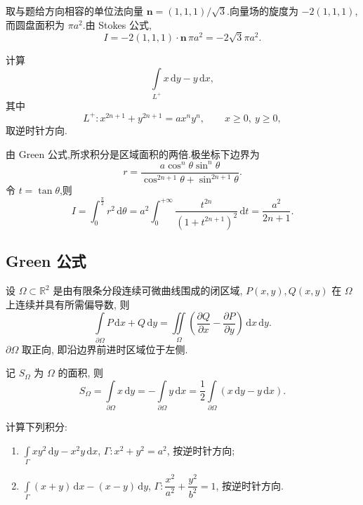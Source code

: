\begin{solution}
    取与题给方向相容的单位法向量 $\bm n=(1,1,1)/\sqrt{3}$.向量场的旋度为 $-2(1,1,1)$,而圆盘面积为 $\pi a^2$.由 Stokes 公式,
    \[
        I=-2(1,1,1)\cdot\bm n\,\pi a^2=-2\sqrt{3}\pi a^2.
    \]
\end{solution}

\begin{example}
    计算
    \[
        \displaystyle\int\limits_{L^+}x\,\mathrm{d}y-y\,\mathrm{d}x,
    \]
    其中
    \[
        L^+:x^{2n+1}+y^{2n+1}=ax^ny^n,\qquad x\geq0,\ y\geq0,
    \]
    取逆时针方向.
\end{example}
\exampleblank

\begin{solution}
    由 Green 公式,所求积分是区域面积的两倍.极坐标下边界为
    \[
        r=\dfrac{a\cos^n\theta\sin^n\theta}{\cos^{2n+1}\theta+\sin^{2n+1}\theta}.
    \]
    令 $t=\tan\theta$,则
    \[
        I=\int_0^{\frac{\pi}{2}}r^2\,\mathrm{d}\theta
        =a^2\int_0^{+\infty}\dfrac{t^{2n}}{(1+t^{2n+1})^2}\,\mathrm{d}t
        =\dfrac{a^2}{2n+1}.
    \]
\end{solution}



\subsection{Green 公式}

\begin{theorem}
    \leavevmode\par\noindent
    设 $\Omega\subset\mathbb{R}^2$ 是由有限条分段连续可微曲线围成的闭区域, $P(x,y),Q(x,y)$ 在 $\Omega$ 上连续并具有所需偏导数, 则
    \[
        \displaystyle\int\limits_{\partial\Omega}P\,\mathrm{d}x+Q\,\mathrm{d}y
        =\iint\limits_\Omega\left(\dfrac{\partial Q}{\partial x}-\dfrac{\partial P}{\partial y}\right)\,\mathrm{d}x\,\mathrm{d}y.
    \]
    $\partial\Omega$ 取正向, 即沿边界前进时区域位于左侧.
\end{theorem}

\begin{corollary}[\markstar]
    记 $S_\Omega$ 为 $\Omega$ 的面积, 则
    \[
        S_\Omega
        =\int\limits_{\partial\Omega}x\,\mathrm{d}y
        =-\int\limits_{\partial\Omega}y\,\mathrm{d}x
        =\dfrac{1}{2}\int\limits_{\partial\Omega}(x\,\mathrm{d}y-y\,\mathrm{d}x).
    \]
\end{corollary}

\begin{example}
    计算下列积分:
    \begin{enumerate}
        \item $\displaystyle\int\limits_\Gamma xy^2\,\mathrm{d}y-x^2y\,\mathrm{d}x$, $\Gamma:x^2+y^2=a^2$, 按逆时针方向;
        \item $\displaystyle\int\limits_\Gamma(x+y)\,\mathrm{d}x-(x-y)\,\mathrm{d}y$, $\Gamma:\dfrac{x^2}{a^2}+\dfrac{y^2}{b^2}=1$, 按逆时针方向.
    \end{enumerate}
\end{example}
\exampleblank

